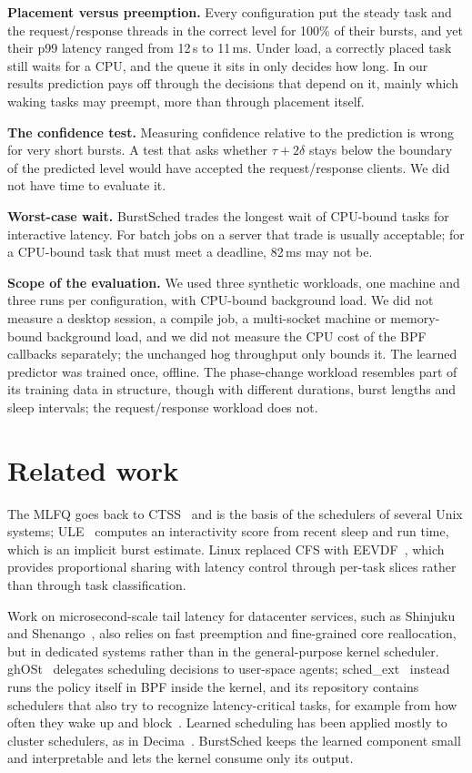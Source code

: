 \documentclass[conference]{IEEEtran}
\newcommand{\us}{\,\textmu{}s}
\newcommand{\ms}{\,ms}
\begin{document}
\textbf{Placement versus preemption.} Every configuration put the steady task and the
request/response threads in the correct level for 100\% of their bursts, and yet their p99
latency ranged from 12\us{} to 11\ms. Under load, a correctly placed task still waits for a CPU,
and the queue it sits in only decides how long. In our results prediction pays off through the
decisions that depend on it, mainly which waking tasks may preempt, more than through placement
itself.

\textbf{The confidence test.} Measuring confidence relative to the prediction is wrong for very
short bursts. A test that asks whether $\tau + 2\delta$ stays below the boundary of the predicted
level would have accepted the request/response clients. We did not have time to evaluate it.

\textbf{Worst-case wait.} BurstSched trades the longest wait of CPU-bound tasks for interactive
latency. For batch jobs on a server that trade is usually acceptable; for a CPU-bound task that
must meet a deadline, 82\ms{} may not be.

\textbf{Scope of the evaluation.} We used three synthetic workloads, one machine and three runs
per configuration, with CPU-bound background load. We did not measure a desktop session, a
compile job, a multi-socket machine or memory-bound background load, and we did not measure the
CPU cost of the BPF callbacks separately; the unchanged hog throughput only bounds it. The
learned predictor was trained once, offline. The phase-change workload resembles part of its
training data in structure, though with different durations, burst lengths and sleep intervals;
the request/response workload does not.

\section{Related work}\label{sec:related}

The MLFQ goes back to CTSS~\cite{corbato} and is the basis of the schedulers of several Unix
systems; ULE~\cite{ule} computes an interactivity score from recent sleep and run time, which is
an implicit burst estimate. Linux replaced CFS with EEVDF~\cite{eevdf,eevdfdoc}, which provides
proportional sharing with latency control through per-task slices rather than through task
classification.

Work on microsecond-scale tail latency for datacenter services, such as Shinjuku~\cite{shinjuku}
and Shenango~\cite{shenango}, also relies on fast preemption and fine-grained core reallocation,
but in dedicated systems rather than in the general-purpose kernel scheduler. ghOSt~\cite{ghost}
delegates scheduling decisions to user-space agents; sched\_ext~\cite{schedext} instead runs the
policy itself in BPF inside the kernel, and its repository contains schedulers that also try to
recognize latency-critical tasks, for example from how often they wake up and
block~\cite{scx}. Learned scheduling has been applied mostly to cluster schedulers, as in
Decima~\cite{decima}. BurstSched keeps the learned component small and interpretable and lets the
kernel consume only its output.
\end{document}
